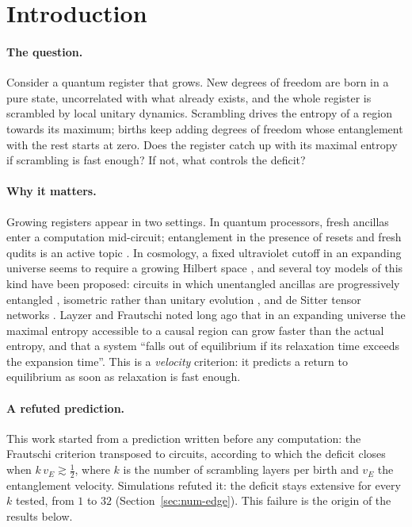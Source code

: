 \section{Introduction}

\paragraph{The question.} Consider a quantum register that grows. New degrees of freedom are born in a pure state, uncorrelated with what already exists, and the whole register is scrambled by local unitary dynamics. Scrambling drives the entropy of a region towards its maximum; births keep adding degrees of freedom whose entanglement with the rest starts at zero. Does the register catch up with its maximal entropy if scrambling is fast enough? If not, what controls the deficit?

\paragraph{Why it matters.} Growing registers appear in two settings. In quantum processors, fresh ancillas enter a computation mid-circuit; entanglement in the presence of resets and fresh qudits is an active topic \cite{PSQ2020,Yokoyama2026}. In cosmology, a fixed ultraviolet cutoff in an expanding universe seems to require a growing Hilbert space \cite{Jacobson1999}, and several toy models of this kind have been proposed: circuits in which unentangled ancillas are progressively entangled \cite{Bao2017}, isometric rather than unitary evolution \cite{CotlerStrominger2022}, and de Sitter tensor networks \cite{BaoDS2017,Cao2023}. Layzer \cite{Layzer1975} and Frautschi \cite{Frautschi1982} noted long ago that in an expanding universe the maximal entropy accessible to a causal region can grow faster than the actual entropy, and that a system ``falls out of equilibrium if its relaxation time exceeds the expansion time''. This is a \emph{velocity} criterion: it predicts a return to equilibrium as soon as relaxation is fast enough.

\paragraph{A refuted prediction.} This work started from a prediction written before any computation: the Frautschi criterion transposed to circuits, according to which the deficit closes when $k\,v_E\gtrsim\frac12$, where $k$ is the number of scrambling layers per birth and $v_E$ the entanglement velocity. Simulations refuted it: the deficit stays extensive for every $k$ tested, from $1$ to $32$ (Section~\ref{sec:num-edge}). This failure is the origin of the results below.

